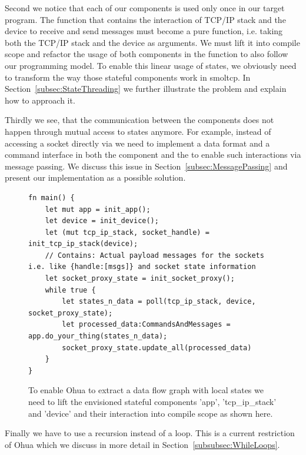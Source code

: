 Second we notice that each of our components is used only once in our target program. The function  that contains the interaction of  TCP/IP stack and the device to receive and send messages must become a pure function, i.e. taking both the TCP/IP stack and the device as arguments. We must lift it into compile scope and refactor the  usage of both components in the function to also follow our programming model. To enable this linear usage of states, we obviously need to transform the way those stateful components work in smoltcp. In Section~\ref{subsec:StateThreading} we further illustrate the problem and explain how to approach it.

Thirdly we see, that the communication between the components does not happen through mutual access to states anymore. For example, instead of accessing a socket directly via  we need to implement a data format and a command interface in both the  component and the  to enable such interactions via message passing. We discuss this issue in Section~\ref{subsec:MessagePassing} and present our implementation as a possible solution.

\begin{figure}[H]
    \centering
    
\begin{verbatim}
fn main() {
    let mut app = init_app();
    let device = init_device();
    let (mut tcp_ip_stack, socket_handle) = init_tcp_ip_stack(device);
    // Contains: Actual payload messages for the sockets i.e. like {handle:[msgs]} and socket state information
    let socket_proxy_state = init_socket_proxy();
    while true {
        let states_n_data = poll(tcp_ip_stack, device, socket_proxy_state);
        let processed_data:CommandsAndMessages = app.do_your_thing(states_n_data);
        socket_proxy_state.update_all(processed_data) 
    }
}
\end{verbatim}
    \caption{To enable Ohua to extract a data flow graph with local states we need to lift the envisioned stateful components 'app', 'tcp\_ip\_stack' and 'device' and their interaction into compile scope as shown here.}
    \label{fig:newTopLevel}
\end{figure}

Finally we have to use a recursion instead of a  loop. This is a current restriction of Ohua which we discuss in more detail in Section~\ref{subsubsec:WhileLoops}. 




